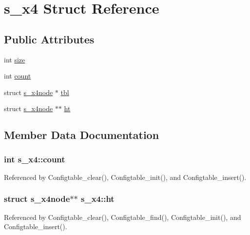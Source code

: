 \hypertarget{structs__x4}{\section{s\-\_\-x4 Struct Reference}
\label{structs__x4}
}
\subsection*{Public Attributes}
\begin{DoxyCompactItemize}
\item 
int \hyperlink{structs__x4_a9438094aabcc61974b103715c633e76a}{size}
\item 
int \hyperlink{structs__x4_a54e58025ab32a7176316db919955d4de}{count}
\item 
struct \hyperlink{structs__x4node}{s\-\_\-x4node} $\ast$ \hyperlink{structs__x4_aebad5c8178977d983aa7f24bf46be059}{tbl}
\item 
struct \hyperlink{structs__x4node}{s\-\_\-x4node} $\ast$$\ast$ \hyperlink{structs__x4_a97f399a5e2ba495521f6a552afd384e8}{ht}
\end{DoxyCompactItemize}


\subsection{Member Data Documentation}
\hypertarget{structs__x4_a54e58025ab32a7176316db919955d4de}{
\subsubsection[{count}]{\setlength{\rightskip}{0pt plus 5cm}int s\-\_\-x4\-::count}}\label{structs__x4_a54e58025ab32a7176316db919955d4de}


Referenced by Configtable\-\_\-clear(), Configtable\-\_\-init(), and Configtable\-\_\-insert().

\hypertarget{structs__x4_a97f399a5e2ba495521f6a552afd384e8}{
\subsubsection[{ht}]{\setlength{\rightskip}{0pt plus 5cm}struct {\bf s\-\_\-x4node}$\ast$$\ast$ s\-\_\-x4\-::ht}}\label{structs__x4_a97f399a5e2ba495521f6a552afd384e8}


Referenced by Configtable\-\_\-clear(), Configtable\-\_\-find(), Configtable\-\_\-init(), and Configtable\-\_\-insert().

